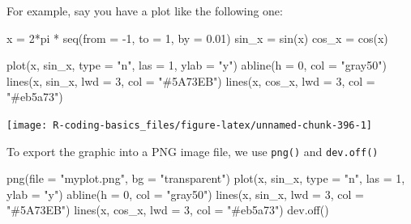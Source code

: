 \documentclass[
]{book}
\newenvironment{Shaded}{\begin{snugshade}}{\end{snugshade}}
\newcommand{\AttributeTok}[1]{\textcolor[rgb]{0.77,0.63,0.00}{#1}}
\newcommand{\DecValTok}[1]{\textcolor[rgb]{0.00,0.00,0.81}{#1}}
\newcommand{\FloatTok}[1]{\textcolor[rgb]{0.00,0.00,0.81}{#1}}
\newcommand{\FunctionTok}[1]{\textcolor[rgb]{0.00,0.00,0.00}{#1}}
\newcommand{\NormalTok}[1]{#1}
\newcommand{\OtherTok}[1]{\textcolor[rgb]{0.56,0.35,0.01}{#1}}
\newcommand{\SpecialCharTok}[1]{\textcolor[rgb]{0.00,0.00,0.00}{#1}}
\newcommand{\StringTok}[1]{\textcolor[rgb]{0.31,0.60,0.02}{#1}}
\begin{document}
For example, say you have a plot like the following one:

\begin{Shaded}
\begin{Highlighting}[]
\NormalTok{x }\OtherTok{=} \DecValTok{2}\SpecialCharTok{*}\NormalTok{pi }\SpecialCharTok{*} \FunctionTok{seq}\NormalTok{(}\AttributeTok{from =} \SpecialCharTok{{-}}\DecValTok{1}\NormalTok{, }\AttributeTok{to =} \DecValTok{1}\NormalTok{, }\AttributeTok{by =} \FloatTok{0.01}\NormalTok{)}
\NormalTok{sin\_x }\OtherTok{=} \FunctionTok{sin}\NormalTok{(x)}
\NormalTok{cos\_x }\OtherTok{=} \FunctionTok{cos}\NormalTok{(x)}

\FunctionTok{plot}\NormalTok{(x, sin\_x, }\AttributeTok{type =} \StringTok{"n"}\NormalTok{, }\AttributeTok{las =} \DecValTok{1}\NormalTok{, }\AttributeTok{ylab =} \StringTok{"y"}\NormalTok{)}
\FunctionTok{abline}\NormalTok{(}\AttributeTok{h =} \DecValTok{0}\NormalTok{, }\AttributeTok{col =} \StringTok{"gray50"}\NormalTok{)}
\FunctionTok{lines}\NormalTok{(x, sin\_x, }\AttributeTok{lwd =} \DecValTok{3}\NormalTok{, }\AttributeTok{col =} \StringTok{"\#5A73EB"}\NormalTok{)}
\FunctionTok{lines}\NormalTok{(x, cos\_x, }\AttributeTok{lwd =} \DecValTok{3}\NormalTok{, }\AttributeTok{col =} \StringTok{"\#eb5a73"}\NormalTok{)}
\end{Highlighting}
\end{Shaded}

\begin{center}\texttt{[image: R-coding-basics\_files/figure-latex/unnamed-chunk-396-1]} \end{center}

To export the graphic into a PNG image file, we use \texttt{png()} and \texttt{dev.off()}

\begin{Shaded}
\begin{Highlighting}[]
\FunctionTok{png}\NormalTok{(}\AttributeTok{file =} \StringTok{"myplot.png"}\NormalTok{, }\AttributeTok{bg =} \StringTok{"transparent"}\NormalTok{)}
\FunctionTok{plot}\NormalTok{(x, sin\_x, }\AttributeTok{type =} \StringTok{"n"}\NormalTok{, }\AttributeTok{las =} \DecValTok{1}\NormalTok{, }\AttributeTok{ylab =} \StringTok{"y"}\NormalTok{)}
\FunctionTok{abline}\NormalTok{(}\AttributeTok{h =} \DecValTok{0}\NormalTok{, }\AttributeTok{col =} \StringTok{"gray50"}\NormalTok{)}
\FunctionTok{lines}\NormalTok{(x, sin\_x, }\AttributeTok{lwd =} \DecValTok{3}\NormalTok{, }\AttributeTok{col =} \StringTok{"\#5A73EB"}\NormalTok{)}
\FunctionTok{lines}\NormalTok{(x, cos\_x, }\AttributeTok{lwd =} \DecValTok{3}\NormalTok{, }\AttributeTok{col =} \StringTok{"\#eb5a73"}\NormalTok{)}
\FunctionTok{dev.off}\NormalTok{()}
\end{Highlighting}
\end{Shaded}
\end{document}

